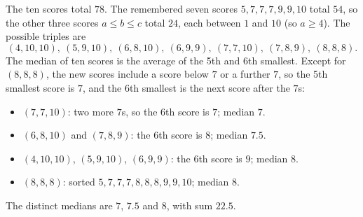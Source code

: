 The ten scores total $78$. The remembered seven scores $5,7,7,7,9,9,10$ total $54$, so the other three scores $a\le b\le c$ total $24$, each between $1$ and $10$ (so $a\ge4$). The possible triples are
\[(4,10,10),\ (5,9,10),\ (6,8,10),\ (6,9,9),\ (7,7,10),\ (7,8,9),\ (8,8,8).\]
The median of ten scores is the average of the 5th and 6th smallest. Except for $(8,8,8)$, the new scores include a score below $7$ or a further $7$, so the 5th smallest score is $7$, and the 6th smallest is the next score after the $7$s:
\begin{itemize}
\item $(7,7,10)$: two more $7$s, so the 6th score is $7$; median $7$.
\item $(6,8,10)$ and $(7,8,9)$: the 6th score is $8$; median $7.5$.
\item $(4,10,10)$, $(5,9,10)$, $(6,9,9)$: the 6th score is $9$; median $8$.
\item $(8,8,8)$: sorted $5,7,7,7,8,8,8,9,9,10$; median $8$.
\end{itemize}
The distinct medians are $7$, $7.5$ and $8$, with sum $\boxed{22.5}$.
